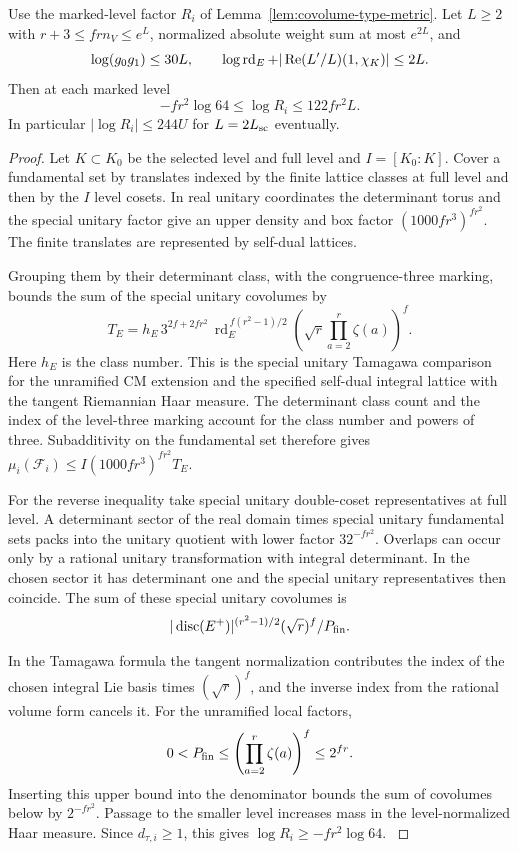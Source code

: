 \begin{lemma}\label{lem:covolume-metric-factor}
Use the marked-level factor \(R_i\) of Lemma~\ref{lem:covolume-type-metric}.
Let \(L\ge2\) with \(r+3\le frn_V\le e^L\), normalized absolute
weight sum at most \(e^{2L}\), and
\[
 \log(g_0g_1)\le30L,\qquad
 \log\operatorname{rd}_E+|\operatorname{Re}(L'/L)(1,\chi_K)|\le2L .
\]
Then at each marked level
\[
 -fr^2\log64\le\log R_i\le122fr^2 L .
\]
In particular \(|\log R_i|\le244U\) for \(L=2L_{\rm sc}\) eventually.
\end{lemma}
\begin{proof}
Let
\(K\subset K_0\) be the selected level and full level and
\(I=[K_0:K]\). Cover a fundamental set by translates
indexed by the finite lattice classes at full level and
then by the \(I\) level cosets. In real unitary coordinates
the determinant torus and the special unitary factor give
an upper density and box factor \((1000fr^3)^{fr^2}\).
The finite translates are represented by self-dual lattices.

Grouping them by their determinant class, with the
congruence-three marking, bounds the sum of the special
unitary covolumes by
\[
 T_E=h_E\,3^{2f+2fr^2}\,
       \operatorname{rd}_E^{\,f(r^2-1)/2}
       \left(\sqrt r\prod_{a=2}^r\zeta(a)\right)^f .
\]
Here \(h_E\) is the class number. This is the special
unitary Tamagawa comparison for the unramified CM extension
and the specified self-dual integral lattice with the tangent
Riemannian Haar measure. The determinant class count and the
index of the level-three marking account for the class number
and powers of three. Subadditivity on the fundamental set
therefore gives \(\mu_i(\mathcal F_i)\le I(1000fr^3)^{fr^2}T_E\).
\label{cor:covolume-component-transfer-19}

For the reverse inequality take special unitary double-coset
representatives at full level. A determinant sector of the real
domain times special unitary fundamental sets packs into the
unitary quotient with lower factor \(32^{-fr^2}\). Overlaps
can occur only by a rational unitary transformation with
integral determinant. In the chosen sector it has determinant
one and the special unitary representatives then coincide.
The sum of these special unitary covolumes is
\[
 |\operatorname{disc}(E^+)|^{(r^2-1)/2}
             (\sqrt r)^f/P_{\rm fin} .
\]

In the Tamagawa formula the tangent normalization contributes
the index of the chosen integral Lie basis times
\((\sqrt r)^f\), and the inverse index from the rational
volume form cancels it. For the unramified local factors,
\[
 0<P_{\rm fin}\le\left(\prod_{a=2}^r\zeta(a)\right)^f\le2^{fr}.
\]
Inserting this upper bound into the denominator bounds the sum
of covolumes below by \(2^{-fr^2}\).
Passage to the smaller level increases mass in the
level-normalized Haar measure. Since \(d_{\tau,i}\ge1\),
this gives \(\log R_i\ge-fr^2\log64\).
\label{cor:covolume-component-transfer-20}


\end{proof}
